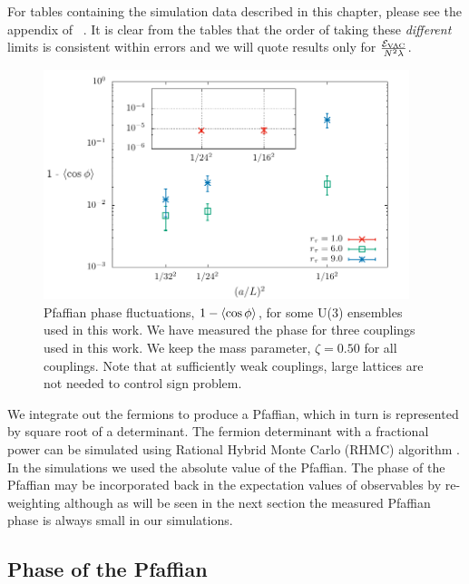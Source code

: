 For tables containing the simulation data described in this chapter, please see the appendix of ~\cite{Catterall:2017xox}. 
It is clear from the tables that the order of taking these \emph{different} limits is consistent within errors and we will quote results only for $\frac{\mathcal{E}_{\mathrm{VAC}}}{N^2 \lambda}$.
\begin{figure}[htb]
\begin{center} 
\includegraphics[width=0.95\textwidth]{Figures/2dq4_sign.pdf}
\end{center}
\caption{\label{fig:pfaffian1}Pfaffian phase fluctuations, $1 - \left\langle \cos\phi \right\rangle$, for some U(3) ensembles used in this work. We have measured the phase for three couplings used in this work. We keep the mass parameter, $\zeta = 0.50$ for all couplings. Note that at sufficiently weak couplings, large lattices are not needed to control sign problem.}
\end{figure}
We integrate out the fermions to produce a Pfaffian, which in turn is represented by square root of a determinant. The fermion determinant with a fractional power can be simulated using Rational Hybrid Monte Carlo (RHMC) algorithm \cite{Clark:2004cp}. In the simulations we used the absolute value of the Pfaffian. The phase of the Pfaffian may be incorporated back in the expectation values of observables by re-weighting although as will be seen in the next section the measured Pfaffian phase is always small in our simulations.

\subsection{Phase of the Pfaffian}
\label{sec:pfaf} 


